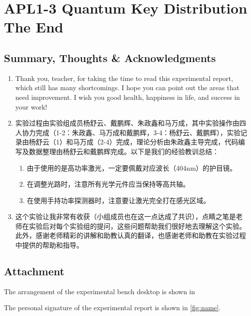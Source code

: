 
\section{APL1-3 Quantum Key Distribution \\ The End}


\subsection{Summary, Thoughts \& Acknowledgments}
\begin{enumerate}
	\item Thank you, teacher, for taking the time to read this experimental report, which still has many shortcomings. I hope you can point out the areas that need improvement. I wish you good health, happiness in life, and success in your work!
	
	\item 实验过程由实验组成员杨舒云、戴鹏辉、朱政鑫和马万成，其中实验操作由四人协力完成（1-2：朱政鑫、马万成和戴鹏辉，3-4：杨舒云、戴鹏辉），实验记录由杨舒云（1）和马万成（2-4）完成，理论分析由朱政鑫主导完成，代码编写及数据整理由杨舒云和戴鹏辉完成。以下是我们的经验教训总结：
	\begin{enumerate}
		\item 由于使用的是高功率激光，一定要佩戴对应波长（404nm）的护目镜。
		\item 在调整光路时，注意所有光学元件应当保持等高共轴。
		\item 在使用手持功率探测器时，注意要让激光完全打在感光区域。
	\end{enumerate}
	
	\item 这个实验让我非常有收获（小组成员也在这一点达成了共识），点睛之笔是老师在实验后对每个实验组的提问，这些问题帮助我们很好地去理解这个实验。此外，感谢老师精彩的讲解和助教认真的翻译，也感谢老师和助教在实验过程中提供的帮助和指导。
\end{enumerate}


\subsection{Attachment}
The arrangement of the experimental bench desktop is shown in %

The personal signature of the experimental report is shown in \cref{fig:name}.

